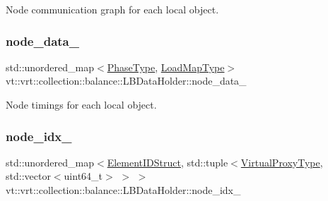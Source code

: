 Node communication graph for each local object. 

\mbox{\label{structvt_1_1vrt_1_1collection_1_1balance_1_1_l_b_data_holder_a946b456d5de23d9a00e91c1dcc12699f}} 
\subsubsection{\texorpdfstring{node\+\_\+data\+\_\+}{node\_data\_}}
{\footnotesize\ttfamily std\+::unordered\+\_\+map$<$\hyperlink{namespacevt_a46ce6733d5cdbd735d561b7b4029f6d7}{Phase\+Type}, \hyperlink{namespacevt_1_1vrt_1_1collection_1_1balance_a5339303db2e1ce964d783a53fd74e6b1}{Load\+Map\+Type}$>$ vt\+::vrt\+::collection\+::balance\+::\+L\+B\+Data\+Holder\+::node\+\_\+data\+\_\+}



Node timings for each local object. 

\mbox{\label{structvt_1_1vrt_1_1collection_1_1balance_1_1_l_b_data_holder_a6b316a4e35ea98e592cbe875074aa6d8}} 
\subsubsection{\texorpdfstring{node\+\_\+idx\+\_\+}{node\_idx\_}}
{\footnotesize\ttfamily std\+::unordered\+\_\+map$<$\hyperlink{namespacevt_1_1vrt_1_1collection_1_1balance_a9f5b53fafb270212279a4757d2c4cd28}{Element\+I\+D\+Struct}, std\+::tuple$<$\hyperlink{namespacevt_a1b417dd5d684f045bb58a0ede70045ac}{Virtual\+Proxy\+Type}, std\+::vector$<$uint64\+\_\+t$>$ $>$ $>$ vt\+::vrt\+::collection\+::balance\+::\+L\+B\+Data\+Holder\+::node\+\_\+idx\+\_\+}



